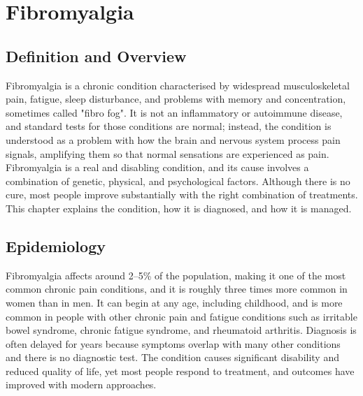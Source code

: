\chapter{Fibromyalgia}

\section*{Definition and Overview}
Fibromyalgia is a chronic condition characterised by widespread musculoskeletal pain, fatigue, sleep disturbance, and problems with memory and concentration, sometimes called "fibro fog". It is not an inflammatory or autoimmune disease, and standard tests for those conditions are normal; instead, the condition is understood as a problem with how the brain and nervous system process pain signals, amplifying them so that normal sensations are experienced as pain. Fibromyalgia is a real and disabling condition, and its cause involves a combination of genetic, physical, and psychological factors. Although there is no cure, most people improve substantially with the right combination of treatments. This chapter explains the condition, how it is diagnosed, and how it is managed.

\section*{Epidemiology}
Fibromyalgia affects around 2--5\% of the population, making it one of the most common chronic pain conditions, and it is roughly three times more common in women than in men. It can begin at any age, including childhood, and is more common in people with other chronic pain and fatigue conditions such as irritable bowel syndrome, chronic fatigue syndrome, and rheumatoid arthritis. Diagnosis is often delayed for years because symptoms overlap with many other conditions and there is no diagnostic test. The condition causes significant disability and reduced quality of life, yet most people respond to treatment, and outcomes have improved with modern approaches.

